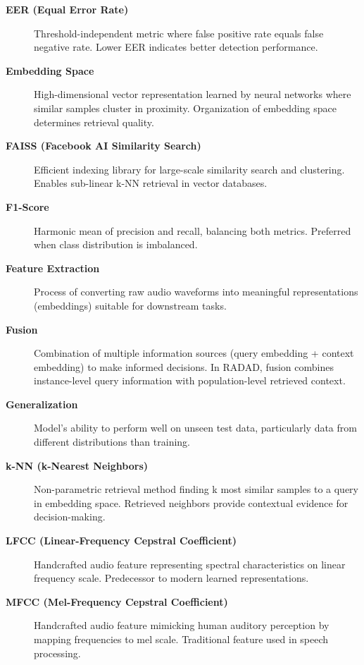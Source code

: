 \begin{description}
    \item[\textbf{EER (Equal Error Rate)}] 
    Threshold-independent metric where false positive rate equals false negative rate. Lower EER indicates better detection performance.
    
    \item[\textbf{Embedding Space}] 
    High-dimensional vector representation learned by neural networks where similar samples cluster in proximity. Organization of embedding space determines retrieval quality.
    
    \item[\textbf{FAISS (Facebook AI Similarity Search)}] 
    Efficient indexing library for large-scale similarity search and clustering. Enables sub-linear k-NN retrieval in vector databases.
    
    \item[\textbf{F1-Score}] 
    Harmonic mean of precision and recall, balancing both metrics. Preferred when class distribution is imbalanced.
    
    \item[\textbf{Feature Extraction}] 
    Process of converting raw audio waveforms into meaningful representations (embeddings) suitable for downstream tasks.
    
    \item[\textbf{Fusion}] 
    Combination of multiple information sources (query embedding + context embedding) to make informed decisions. In RADAD, fusion combines instance-level query information with population-level retrieved context.
    
    \item[\textbf{Generalization}] 
    Model's ability to perform well on unseen test data, particularly data from different distributions than training.
    
    \item[\textbf{k-NN (k-Nearest Neighbors)}] 
    Non-parametric retrieval method finding k most similar samples to a query in embedding space. Retrieved neighbors provide contextual evidence for decision-making.
    
    \item[\textbf{LFCC (Linear-Frequency Cepstral Coefficient)}] 
    Handcrafted audio feature representing spectral characteristics on linear frequency scale. Predecessor to modern learned representations.
    
    \item[\textbf{MFCC (Mel-Frequency Cepstral Coefficient)}] 
    Handcrafted audio feature mimicking human auditory perception by mapping frequencies to mel scale. Traditional feature used in speech processing.
    

\end{description}
